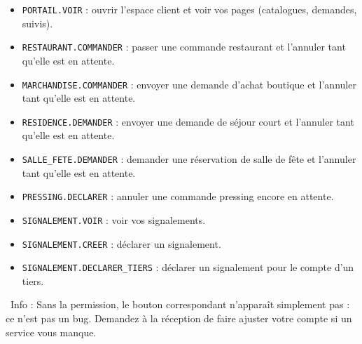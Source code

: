 \documentclass[12pt,a4paper]{article}
\newcommand{\info}[1]{\par\noindent\textcolor{lagoon}{\faInfoCircle\ Info : #1}\par}
\begin{document}
\begin{itemize}[label=\textcolor{lagoon}{\faKey}]
  \item \texttt{PORTAIL.VOIR} : ouvrir l'espace client et voir vos pages (catalogues, demandes, suivis).
  \item \texttt{RESTAURANT.COMMANDER} : passer une commande restaurant et l'annuler tant qu'elle est en attente.
  \item \texttt{MARCHANDISE.COMMANDER} : envoyer une demande d'achat boutique et l'annuler tant qu'elle est en attente.
  \item \texttt{RESIDENCE.DEMANDER} : envoyer une demande de séjour court et l'annuler tant qu'elle est en attente.
  \item \texttt{SALLE\_FETE.DEMANDER} : demander une réservation de salle de fête et l'annuler tant qu'elle est en attente.
  \item \texttt{PRESSING.DECLARER} : annuler une commande pressing encore en attente.
  \item \texttt{SIGNALEMENT.VOIR} : voir vos signalements.
  \item \texttt{SIGNALEMENT.CREER} : déclarer un signalement.
  \item \texttt{SIGNALEMENT.DECLARER\_TIERS} : déclarer un signalement pour le compte d'un tiers.
\end{itemize}

\info{Sans la permission, le bouton correspondant n'apparaît simplement pas : ce n'est pas un bug. Demandez à la réception de faire ajuster votre compte si un service vous manque.}

\vfill

\begin{center}
\end{center}
\end{document}
